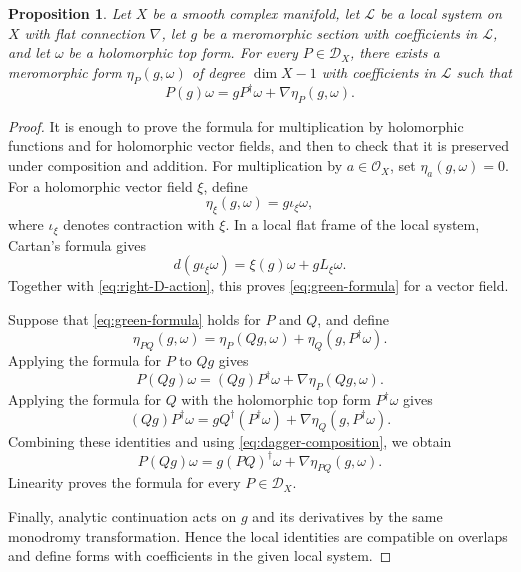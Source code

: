\documentclass[12pt]{amsart}
\numberwithin{equation}{section}
\theoremstyle{plain}
\newtheorem{proposition}[theorem]{Proposition}
\theoremstyle{definition}
\theoremstyle{remark}
\theoremstyle{definition}
\newcommand{\D}{\mathscr D}
\newcommand{\Lcal}{\mathscr L}
\begin{document}
\begin{proposition}\label{prop:green-formula}
Let $X$ be a smooth complex manifold, let $\Lcal$ be a local system on $X$ with flat connection $\nabla$, let $g$ be a meromorphic section with coefficients in $\Lcal$, and let $\omega$ be a holomorphic top form. For every $P\in\D_X$, there exists a meromorphic form $\eta_P(g,\omega)$ of degree $\dim X-1$ with coefficients in $\Lcal$ such that
\begin{equation}\label{eq:green-formula}
P(g)\omega=gP^\dagger\omega+\nabla\eta_P(g,\omega).
\end{equation}
\end{proposition}

\begin{proof}
It is enough to prove the formula for multiplication by holomorphic functions and for holomorphic vector fields, and then to check that it is preserved under composition and addition. For multiplication by $a\in\mathcal O_X$, set $\eta_a(g,\omega)=0$. For a holomorphic vector field $\xi$, define
\begin{equation}\label{eq:first-order-concomitant}
\eta_\xi(g,\omega)=g\iota_\xi\omega,
\end{equation}
where $\iota_\xi$ denotes contraction with $\xi$. In a local flat frame of the local system, Cartan's formula gives
\begin{equation*}
d(g\iota_\xi\omega)=\xi(g)\omega+gL_\xi\omega.
\end{equation*}
Together with \eqref{eq:right-D-action}, this proves \eqref{eq:green-formula} for a vector field.

Suppose that \eqref{eq:green-formula} holds for $P$ and $Q$, and define
\begin{equation}\label{eq:concomitant-recursion}
\eta_{PQ}(g,\omega)=\eta_P(Qg,\omega)+\eta_Q(g,P^\dagger\omega).
\end{equation}
Applying the formula for $P$ to $Qg$ gives
\begin{equation*}
P(Qg)\omega=(Qg)P^\dagger\omega+\nabla\eta_P(Qg,\omega).
\end{equation*}
Applying the formula for $Q$ with the holomorphic top form $P^\dagger\omega$ gives
\begin{equation*}
(Qg)P^\dagger\omega=gQ^\dagger(P^\dagger\omega)+\nabla\eta_Q(g,P^\dagger\omega).
\end{equation*}
Combining these identities and using \eqref{eq:dagger-composition}, we obtain
\begin{equation*}
P(Qg)\omega=g(PQ)^\dagger\omega+\nabla\eta_{PQ}(g,\omega).
\end{equation*}
Linearity proves the formula for every $P\in\D_X$.

Finally, analytic continuation acts on $g$ and its derivatives by the same monodromy transformation. Hence the local identities are compatible on overlaps and define forms with coefficients in the given local system.
\end{proof}
\end{document}
